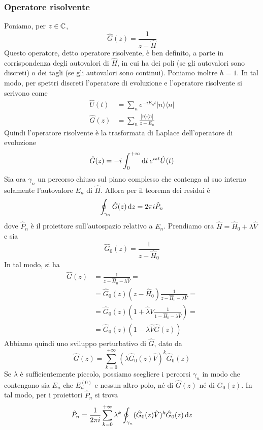 \documentclass[a4paper, 11pt]{article}
\newcommand{\op}[1]{\hat{#1}}
\renewcommand{\op}[1]{\hat{#1}}
\newcommand{\ham}{\hat{H}}
\renewcommand{\ket}[1]{| #1\rangle}
\renewcommand{\bra}[1]{\langle #1|}
\begin{document}
 \subsubsection{Operatore risolvente}
 Poniamo, per $z\in\mathbb{C} $,
 \[\op G(z)=\frac{1}{z-\ham}\]
 Questo operatore, detto operatore risolvente, è ben definito, a parte in corrispondenza degli autovalori di $\ham$, in cui ha dei poli (se gli autovalori sono discreti) o dei tagli (se gli autovalori sono continui). Poniamo inoltre $\hbar=1$. In tal modo, per spettri discreti l'operatore di evoluzione e l'operatore risolvente si scrivono come
 \begin{align*}
 	\op U(t)&=\sum_{n}e^{-iE_nt}\ket{n}\bra {n}\\\op G(z)&=\sum_{n}\frac{\ket n\bra n}{z-E_n}
 \end{align*}
 Quindi l'operatore risolvente è la trasformata di Laplace dell'operatore di evoluzione
 \[\op G(z)=-i\int_{0}^{+\infty}\d t\,e^{izt}\op U(t)\]
Sia ora $\gamma_n$ un percorso chiuso sul piano complesso che contenga al suo interno solamente l'autovalore $E_n$ di $\ham$. Allora per il teorema dei residui è
\[\oint_{\gamma_n}\op G(z)\,\d z=2\pi i\op P_n\]
dove $\op P_n$ è il proiettore sull'autospazio relativo a $E_n$. Prendiamo ora $\ham=\ham_0+\lambda \op V$ e sia
\[\op G_0(z)=\frac{1}{z-\ham_0}\]
In tal modo, si ha
\begin{align*}
	\op G(z)&=\frac{1}{z-\ham_0-\lambda\op V}=\\&=\op G_0(z)(z-\ham_0)\frac{1}{z-\ham_0-\lambda\op V}=\\&=\op G_0(z)\left(1+\op \lambda V\frac{1}{1-\ham_0-\lambda\op V}\right)=\\&=\op G_0(z)\left(1-\lambda\op V\op G(z)\right)
\end{align*}
Abbiamo quindi uno sviluppo perturbativo di $\op G$, dato da
\[\op G(z)=\sum_{k=0}^{+\infty}(\lambda\op G_0(z)\op V)^k\op G_0(z)\]
Se $\lambda$ è sufficientemente piccolo, possiamo scegliere i percorsi $\gamma_n$ in modo che contengano sia $E_n$ che $E_n^{(0)}$ e nessun altro polo, né di $\op G(z)$ né di $\op G_0(z)$. In tal modo, per i proiettori $\op P_n$ si trova
\[\op P_n=\frac{1}{2\pi i}\sum_{k=0}^{+\infty}\lambda^k\oint_{\gamma_n}(\op G_0(z)\op V)^k\op G_0(z)\,\d z\]
\end{document}
